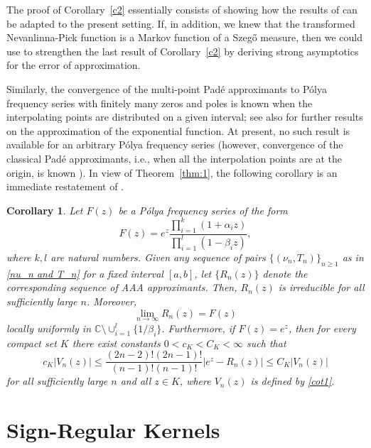 \documentclass[twoside,a4paper]{amsart}
\newcommand{\C}     {\mathbb{C}}
\def\ge{\geqslant}
\newtheorem{corollary}[theorem]{Corollary}
\theoremstyle{remark}
\begin{document}
The proof of Corollary~\ref{c2} essentially consists of showing how the results of \cite{GL} can be adapted to the present setting. If, in addition, we knew that the transformed Nevanlinna-Pick function is a Markov function of a Szeg\H{o} measure, then we could use \cite{St00} to strengthen the last result of Corollary~\ref{c2} by deriving strong asymptotics for the error of approximation.

Similarly, the convergence of the multi-point Pad\'e approximants to P\'olya frequency series with finitely many zeros and poles  is known \cite{MR1370511} when the interpolating points are distributed on a given interval; see also \cite{Frank3,Frank1,Frank2} for further results on the approximation of the exponential function. At present, no such result is available for an arbitrary P\'olya frequency series (however, convergence of the classical Pad\'e approximants, i.e., when all the interpolation points are at the origin, is  known \cite{MR276452}). In view of Theorem~\ref{thm:1}, the following corollary is  an immediate restatement of \cite[Theorems~2.2 and~2.9]{MR1370511}.

\begin{corollary}
Let \( F(z) \) be a P\'olya frequency series of the form
\[
F(z) = e^z \frac{\prod_{i=1}^k(1+\alpha_i z)}{\prod_{i=1}^l(1-\beta_i z)},
\]
where \( k,l \) are natural numbers. Given any sequence of pairs \( \{(\nu_n,T_n)\}_{n\ge 1}\) as in \eqref{nu_n and T_n} for a fixed interval \( [a,b] \), let \( \{ R_n(z) \}\) denote the corresponding sequence of AAA approximants. Then, \( R_n(z)\) is irreducible for all sufficiently large \( n \). Moreover,
\[
\lim_{n\to\infty} R_n(z) = F(z)
\]
locally uniformly in \( \C\setminus\cup_{i=1}^l\{1/\beta_i \} \). Furthermore, if \( F(z)=e^z \), then for every compact set \( K \) there exist constants \( 0<c_K<C_K<\infty \) such that
\[
c_K|V_n(z)| \leq \frac{(2n-2)!(2n-1)!}{(n-1)!(n-1)!}|e^z-R_n(z)| \leq C_K|V_n(z)|
\]
for all sufficiently large \( n \)  and all \( z\in K \), where \( V_n(z) \) is defined by \eqref{cot1}.
\end{corollary}

\section{Sign-Regular Kernels}
\end{document}
